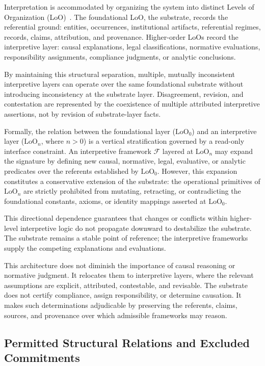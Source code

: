 Interpretation is accommodated by organizing the system
into distinct Levels of Organization (LoO)~\citep{floridi2011philosophy}.
The foundational LoO, the substrate,
records the referential ground:
entities, occurrences, institutional artifacts,
referential regimes, records, claims, attribution,
and provenance.
Higher-order LoOs record the interpretive layer:
causal explanations, legal classifications,
normative evaluations, responsibility assignments,
compliance judgments, or analytic conclusions.

By maintaining this structural separation,
multiple, mutually inconsistent interpretive layers
can operate over the same foundational substrate
without introducing inconsistency at the substrate layer.
Disagreement, revision, and contestation are represented
by the coexistence of multiple attributed interpretive assertions,
not by revision of substrate-layer facts.

Formally, the relation between the foundational layer
($\mathrm{LoO}_0$) and an interpretive layer
($\mathrm{LoO}_n$, where $n > 0$)
is a vertical stratification
governed by a read-only interface constraint.
An interpretive framework $\mathcal{F}$
layered at $\text{LoO}_n$
may expand the signature by defining
new causal, normative, legal, evaluative, or analytic predicates
over the referents established by $\mathrm{LoO}_0$.
However, this expansion constitutes a
conservative extension of the substrate:
the operational primitives of $\mathrm{LoO}_n$ are
strictly prohibited from mutating, retracting, or contradicting
the foundational constants, axioms, or identity mappings
asserted at $\mathrm{LoO}_0$.

This directional dependence guarantees that
changes or conflicts within higher-level interpretive logic
do not propagate downward to destabilize the substrate.
The substrate remains a stable point of reference;
the interpretive frameworks supply the competing explanations
and evaluations.

This architecture does not diminish the importance of causal reasoning
or normative judgment.
It relocates them to interpretive layers,
where the relevant assumptions are explicit,
attributed, contestable, and revisable.
The substrate does not certify compliance,
assign responsibility, or determine causation.
It makes such determinations adjudicable
by preserving the referents, claims, sources, and provenance
over which admissible frameworks may reason.

\subsection{Permitted Structural Relations and Excluded Commitments}
\label{sec:structural-relations}

